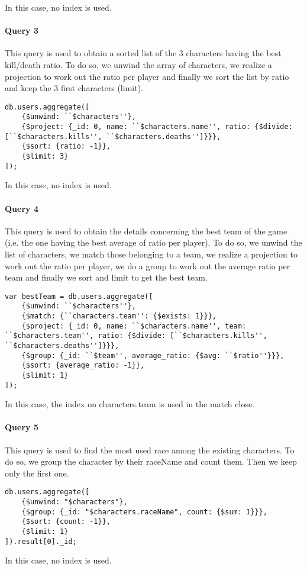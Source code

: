 \documentclass[a4paper, 11pt]{article}
\begin{document}
In this case, no index is used.

\paragraph*{Query 3\\}
This query is used to obtain a sorted list of the 3 characters having the best kill/death ratio. To do so, we unwind the array of characters, we realize a projection to work out the ratio per player and finally we sort the list by ratio and keep the 3 first characters (limit).

\begin{lstlisting}
db.users.aggregate([
    {$unwind: ``$characters''}, 
    {$project: {_id: 0, name: ``$characters.name'', ratio: {$divide: [``$characters.kills'', ``$characters.deaths'']}}},
    {$sort: {ratio: -1}},
    {$limit: 3}
]);
\end{lstlisting}

In this case, no index is used.

\paragraph*{Query 4\\}

This query is used to obtain the details concerning the best team of the game (i.e. the one having the best average of ratio per player).
To do so, we unwind the list of characters, we match those belonging to a team, we realize a projection to work out the ratio per player, we do a group to work out the average ratio per team and finally we sort and limit to get the best team.

\begin{lstlisting}
var bestTeam = db.users.aggregate([
    {$unwind: ``$characters''}, 
    {$match: {``characters.team'': {$exists: 1}}},
    {$project: {_id: 0, name: ``$characters.name'', team: ``$characters.team'', ratio: {$divide: [``$characters.kills'', ``$characters.deaths'']}}},
    {$group: {_id: ``$team'', average_ratio: {$avg: ``$ratio''}}},
    {$sort: {average_ratio: -1}},
    {$limit: 1}
]);
\end{lstlisting}

In this case, the index on characters.team is used in the match close.

\paragraph*{Query 5\\}
This query is used to find the most used race among the existing characters. To do so, we group the character by their raceName and count them. Then we keep only the first one.

\begin{lstlisting}
db.users.aggregate([
    {$unwind: "$characters"},
    {$group: {_id: "$characters.raceName", count: {$sum: 1}}},
    {$sort: {count: -1}},
    {$limit: 1}
]).result[0]._id;
\end{lstlisting}

In this case, no index is used.
\end{document}
